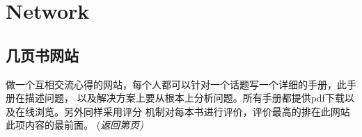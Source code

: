 \documentclass{article}
\begin{document}
\section{Network}
\subsection{几页书网站}
做一个互相交流心得的网站，每个人都可以针对一个话题写一个详细的手册，此手册在描述问题，
以及解决方案上要从根本上分析问题。所有手册都提供pdf下载以及在线浏览。另外同样采用评分
机制对每本书进行评价，评价最高的排在此网站此项内容的最前面。
{(\it{返回第\pageref{sec:firstPage}页})}



%
%
%
%
%
%
%
\end{document}

